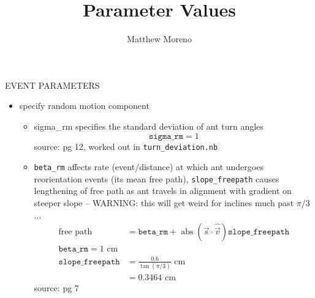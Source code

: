 \documentclass{article}
\title{Parameter Values}
\author{Matthew Moreno}
\theoremstyle{definition}
\begin{document}
    

EVENT PARAMETERS
\begin{itemize}
	\item  specify random motion component
	\begin{itemize}
    	\item sigma\_rm specifies the standard deviation of ant turn angles 
      	\[ \texttt{sigma\_rm} = 1 \]
        source: \cite{khuong_how_2013} pg 12, worked out in \texttt{turn_deviation.nb}
      
      	\item \texttt{beta\_rm} affects rate (event/distance) at which ant undergoes reorientation events (its mean free path), \texttt{slope\_freepath} causes lengthening of free path as ant travels in alignment with gradient on steeper slope -- WARNING: this will get weird for inclines much past $\pi/3$...
      	\begin{align*}
        	\text{free path} 
            &= \texttt{beta\_rm} + \operatorname{abs}(\vec{s} \cdot \hat{\vec{v}}) \texttt{slope\_freepath}  \\
            \texttt{beta\_rm} = 1  \text{ cm}\\
            \texttt{slope\_freepath} 
            &= \frac{0.6}{\tan(\pi/3)} \text{ cm}	 \\		
            &= 0.3464  \text{ cm}
        \end{align*}
                source: \cite{khuong_how_2013} pg 7


\end{itemize}
\end{itemize}
\end{document}
